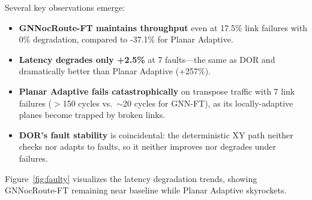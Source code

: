 \begin{table}[h]
\centering
\caption{Fault resilience comparison on Mesh $4\times4$ (latency in cycles, uniform + transpose)}
\label{tab:faulty}
\vspace{2mm}
\end{table}

Several key observations emerge:
\begin{itemize}
    \item \textbf{GNNocRoute-FT maintains throughput} even at 17.5\% link failures with 0\% degradation, compared to -37.1\% for Planar Adaptive.
    \item \textbf{Latency degrades only +2.5\%} at 7 faults---the same as DOR and dramatically better than Planar Adaptive (+257\%).
    \item \textbf{Planar Adaptive fails catastrophically} on transpose traffic with 7 link failures ($>$150 cycles vs.~$\sim$20 cycles for GNN-FT), as its locally-adaptive planes become trapped by broken links.
    \item \textbf{DOR's fault stability} is coincidental: the deterministic XY path neither checks nor adapts to faults, so it neither improves nor degrades under failures.
\end{itemize}

Figure~\ref{fig:faulty} visualizes the latency degradation trends, showing GNNocRoute-FT remaining near baseline while Planar Adaptive skyrockets.

